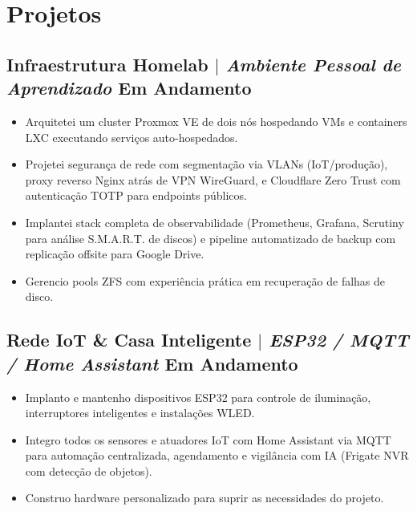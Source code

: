 \documentclass[11.5pt]{article}
\begin{document}
\section{Projetos}
\subsection{Infraestrutura Homelab $|$ \normalfont\textit{Ambiente Pessoal de Aprendizado} \hfill Em Andamento}
\begin{itemize}
	\item Arquitetei um cluster Proxmox VE de dois n\'{o}s hospedando VMs e containers LXC executando servi\c{c}os auto-hospedados.
	\item Projetei seguran\c{c}a de rede com segmenta\c{c}\~{a}o via VLANs (IoT/produ\c{c}\~{a}o), proxy reverso Nginx atr\'{a}s de VPN WireGuard, e Cloudflare Zero Trust com autentica\c{c}\~{a}o TOTP para endpoints p\'{u}blicos.
	\item Implantei stack completa de observabilidade (Prometheus, Grafana, Scrutiny para an\'{a}lise S.M.A.R.T. de discos) e pipeline automatizado de backup com replica\c{c}\~{a}o offsite para Google Drive.
	\item Gerencio pools ZFS com experi\^{e}ncia pr\'{a}tica em recupera\c{c}\~{a}o de falhas de disco.
\end{itemize}

\subsection{Rede IoT \& Casa Inteligente $|$ \normalfont\textit{ESP32 / MQTT / Home Assistant} \hfill Em Andamento}
\begin{itemize}
	\item Implanto e mantenho dispositivos ESP32 para controle de ilumina\c{c}\~{a}o, interruptores inteligentes e instala\c{c}\~{o}es WLED.
	\item Integro todos os sensores e atuadores IoT com Home Assistant via MQTT para automa\c{c}\~{a}o centralizada, agendamento e vigil\^{a}ncia com IA (Frigate NVR com detec\c{c}\~{a}o de objetos).
	\item Construo hardware personalizado para suprir as necessidades do projeto.
\end{itemize}
\end{document}
